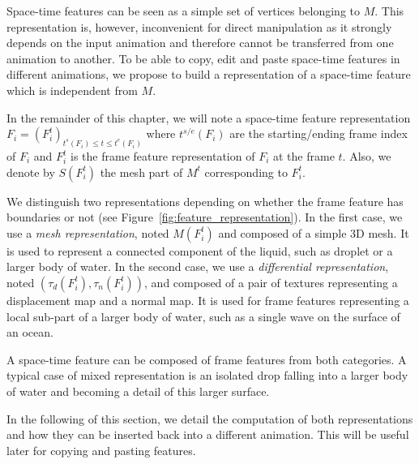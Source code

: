 Space-time features can be seen as a simple set of vertices belonging to $M$.
This representation is, however, inconvenient for direct manipulation as it strongly depends on the input animation and therefore cannot be transferred from one animation to another. 
To be able to copy, edit and paste space-time features in different animations, we propose to build a representation of a space-time feature which is independent from $M$.

In the remainder of this chapter, we will note a space-time feature representation $F_{i} = \left( F_{i}^{t} \right)_{t^{s}\left(F_{i}\right) \leq t \leq t^{e}\left(F_{i}\right)}$ where $t^{s/e}(F_{i})$ are the starting/ending frame index of $F_{i}$ and $F_{i}^{t}$ is the frame feature representation of $F_{i}$ at the frame $t$. 
Also, we denote by $S(F_{i}^{t})$ the mesh part of $M^{t}$ corresponding to $F_{i}^{t}$.

We distinguish two representations depending on whether the frame feature has boundaries or not (see Figure~\ref{fig:feature_representation}). 
In the first case, we use a \emph{mesh representation}, noted $M(F^t_i)$ and composed of a simple $3$D mesh. 
It is used to represent a connected component of the liquid, such as droplet or a larger body of water.
In the second case, we use a \emph{differential representation}, noted $(\tau_d(F^t_i), \tau_n(F^t_i))$, and composed of a pair of textures representing a displacement map and a normal map.
It is used for frame features representing a local sub-part of a larger body of water, such as a single wave on the surface of an ocean.

A space-time feature can be composed of frame features from both categories.
A typical case of mixed representation is an isolated drop falling into a larger body of water and becoming a detail of this larger surface.

In the following of this section, we detail the computation of both representations and how they can be inserted back into a different animation. This will be useful later for copying and pasting features.

